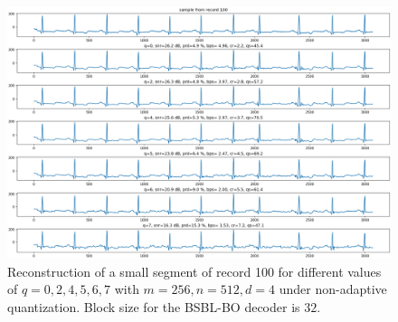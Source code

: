 \begin{figure}[!ht]
\centering 
\includegraphics[width=0.95\linewidth]
{images/rec_100_q_cr_prd_qs.png}
\caption{Reconstruction of a small segment of record 100
for different values of $q=0,2,4,5,6,7$ with $m=256,n=512,d=4$
under non-adaptive quantization.
Block size for the BSBL-BO decoder is $32$.}
\label{fig:100:q:0-7}
\end{figure}
